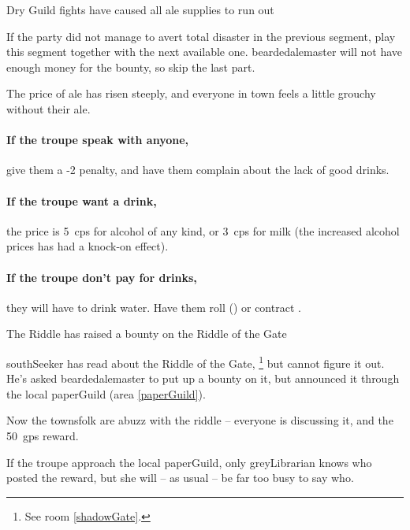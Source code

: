 {\squash Dry}%
{Guild fights have caused all ale supplies to run out}%

If the party did not manage to avert total disaster in the previous \gls{segment}, play this \gls{segment} together with the next available one.
\Gls{beardedalemaster} will not have enough money for the bounty, so skip the last part.

The price of ale has risen steeply, and everyone in \gls{town} feels a little grouchy without their ale.

\paragraph{If the troupe speak with anyone,}
give them a -2 penalty, and have them complain about the lack of good drinks.

\paragraph{If the troupe want a drink,}
the price is 5~\glspl{cp} for alcohol of any kind, or 3~\glspl{cp} for milk (the increased alcohol prices has had a knock-on effect).

\paragraph{If the troupe don't pay for drinks,}
they will have to drink water.
Have them roll  (\tn[10]) or contract \iftoggle{judgement}{Spychoke\exRef{judgement}{Judgement}{diseases}}{a nasty disease}.

{The Riddle}%
{ has raised a bounty on the Riddle of the Gate}%

\Gls{southSeeker} has read about the Riddle of the Gate,%
\footnote{See room \vref{shadowGate}.}
but cannot figure it out.
He's asked \gls{beardedalemaster} to put up a bounty on it, but announced it through the local \gls{paperGuild} (area \vref{paperGuild}).

Now the townsfolk are abuzz with the riddle -- everyone is discussing it, and the 50~\glspl{gp} reward.

\null
\hardestRiddleEver

If the troupe approach the local \gls{paperGuild}, only \gls{greyLibrarian} knows who posted the reward, but she will -- as usual -- be far too busy to say who.

